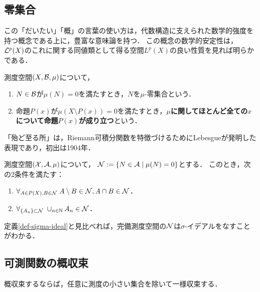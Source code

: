 \documentclass[uplatex, dvipdfmx]{jsreport}
\begin{document}
\subsection{零集合}

\begin{tcolorbox}[colframe=ForestGreen, colback=ForestGreen!10!white,breakable,colbacktitle=ForestGreen!40!white,coltitle=black,fonttitle=\bfseries\sffamily,
title=]
    この「だいたい」「概」の言葉の使い方は，代数構造に支えられた数学的強度を持つ概念である上に，豊富な意味論を持つ．
    この概念の数学的安定性は，$\mathcal{L}^p(X)$のこれに関する同値類として得る空間$L^p(X)$の良い性質を見れば明らかである．
\end{tcolorbox}

\begin{definition}
    測度空間$(X,\mathcal{B},\mu)$について，
    \begin{enumerate}
        \item $N\in\mathcal{B}$が$\mu(N)=0$を満たすとき，$N$を$\mu$-零集合という．
        \item 命題$P(x)$が$\mu(X\setminus P(x))=0$を満たすとき，\textbf{$\mu$に関してほとんど全ての$x$について命題$P(x)$が成り立つ}という．
    \end{enumerate}
\end{definition}
\begin{history}
    「殆ど至る所」は，Riemann可積分関数を特徴づけるためにLebesgueが発明した表現であり，初出は1904年\cite{Lebesgue04}．
\end{history}

\begin{lemma}
    測度空間$(\mathcal{X},\mathcal{A},\mu)$について，
    $\mathcal{N}:=\left\{N\in\mathcal{A}\mid \mu(N)=0\right\}$とする．
    このとき，次の2条件を満たす：
    \begin{enumerate}
        \item $\forall_{A\in P(X),B\in\mathcal{N}}\;A\setminus B\in\mathcal{N},A\cap B\in\mathcal{N}$．
        \item $\forall_{\{A_n\}\subset\mathcal{N}}\;\cup_{n\in\mathbb{N}}A_n\in\mathcal{N}$．
    \end{enumerate}
    定義\ref{def-sigma-ideal}と見比べれば，完備測度空間の$\mathcal{N}$は$\sigma$-イデアルをなすことがわかる．
\end{lemma}

\subsection{可測関数の概収束}

\begin{tcolorbox}[colframe=ForestGreen, colback=ForestGreen!10!white,breakable,colbacktitle=ForestGreen!40!white,coltitle=black,fonttitle=\bfseries\sffamily,
title=]
    概収束するならば，任意に測度の小さい集合を除いて一様収束する．
\end{tcolorbox}
\end{document}
